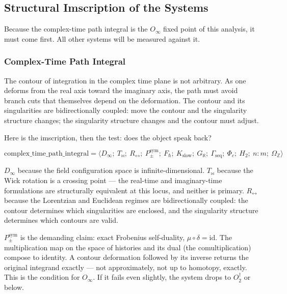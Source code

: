 \documentclass[12pt,a4paper]{article}
\begin{document}
\subsection{Structural Imscription of the Systems}

Because the complex-time path integral is the $O_{\infty}$ fixed point of this analysis, it must come first. All other systems will be measured against it.

\subsubsection{Complex-Time Path Integral}

The contour of integration in the complex time plane is not arbitrary. As one deforms from the real axis toward the imaginary axis, the path must avoid branch cuts that themselves depend on the deformation. The contour and its singularities are bidirectionally coupled: move the contour and the singularity structure changes; the singularity structure changes and the contour must adjust.

Here is the imscription, then the test: does the object speak back?


\[\text{complex\_time\_path\_integral} = \langle D_{\infty};\ T_{\bowtie};\ R_{\leftrightarrow};\ P_{\pm}^{\text{sym}};\ F_{\hbar};\ K_{\text{slow}};\ G_{\aleph};\ \Gamma_{\text{seq}};\ \Phi_c;\ H_2;\ n{:}m;\ \Omega_\mathbb{Z} \rangle\]

$D_{\infty}$ because the field configuration space is infinite-dimensional. $T_{\bowtie}$ because the Wick rotation is a crossing point --- the real-time and imaginary-time formulations are structurally equivalent at this locus, and neither is primary. $R_{\leftrightarrow}$ because the Lorentzian and Euclidean regimes are bidirectionally coupled: the contour determines which singularities are enclosed, and the singularity structure determines which contours are valid.

$P_{\pm}^{\text{sym}}$ is the demanding claim: exact Frobenius self-duality, $\mu \circ \delta = \text{id}$. The multiplication map on the space of histories and its dual (the comultiplication) compose to identity. A contour deformation followed by its inverse returns the original integrand exactly --- not approximately, not up to homotopy, exactly. This is the condition for $O_{\infty}$. If it fails even slightly, the system drops to $O_2^\dagger$ or below.
\end{document}
